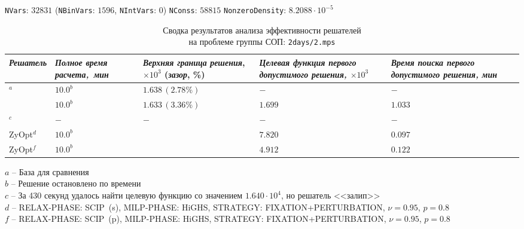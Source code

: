 \documentclass[%
	11pt,
	a4paper,
	utf8,
		]{article}
\begin{document}
\vspace*{5mm}

{
	\begin{table}[!h]
		\centering
		\caption{Сводка результатов анализа эффективности решателей\\ на проблеме группы СОП: \texttt{2days/2.mps}} 
		
		{\footnotesize \texttt{NVars}: $ 32 831 $ (\texttt{NBinVars}: $ 1596 $,  \texttt{NIntVars}: $ 0 $) \texttt{NConss}: $ 58815 $ \texttt{NonzeroDensity}: $ 8.2088 \cdot 10^{-5} $}\\[2mm]
		
		\begin{tabular}{ p{2.9cm} | p{2.5cm} p{3.4cm} p{3.75cm} p{3.6cm} p{3.2cm} }
			\rowcolor{black!5}\emph{Решатель} & \emph{Полное время \mbox{расчета, мин}} & \emph{Верхняя граница} \mbox{\itshape решения}, $ \times 10^{3} $ (\emph{зазор}, \%) & \emph{Целевая функция первого допустимого решения, $ \times 10^3 $} & \emph{Время поиска первого допустимого решения, мин} \\
			\hline
			\rowcolor{blue!3}{CPLEX 12.8.0.0}$ ^a $ & $ 10.0^b $ & $ 1.638 \, (2.78\%) $ & $ - $ & $ - $ \\
			\rowcolor{black!5}{SCIP 8.0.3} & $ 10.0^b $ & $ 1.633 \, (3.36\%) $ & $ 1.699 $ & $ 1.033 $ \\
			\rowcolor{blue!3}{HiGHS 1.5.3}$ ^c $ & $ - $ & $ - $ & $ - $ & $ - $ \\
			\rowcolor{black!5}ZyOpt$^d$ & {$ 10.0^b $}  & \ccb{$ 1.647 \, (4.33\%) (-0.5\%) $} & $ 7.820$ & $ 0.097 $ \\
			\rowcolor{blue!3}ZyOpt$^f$ & {$ 10.0^b $}  & \ccb{$ 1.668 \, (5.54\%) (-1.8\%) $} & $ 4.912 $ & $ 0.122 $ \\
		\end{tabular}
	\end{table}
	\vspace*{-3mm}
	\hspace*{3mm}$ a $ -- {\footnotesize База для сравнения}\\[-7mm]
	
	\hspace*{3mm}$ b $ -- {\footnotesize Решение остановлено по времени}\\[-7mm]
	
	\hspace*{3mm}$ c $ -- {\footnotesize За 430 секунд удалось найти целевую функцию со значением $ 1.640 \cdot 10^{4} $, но решатель <<залип>>}\\[-7mm]
	
	\hspace*{3mm}$ d $ -- {\footnotesize RELAX-PHASE: SCIP~(s), MILP-PHASE: HiGHS, STRATEGY: FIXATION+PERTURBATION, $ \nu = 0.95 $, $ p = 0.8 $}\\[-7mm]
	
	\hspace*{3mm}$ f $ -- {\footnotesize RELAX-PHASE: SCIP~(p), MILP-PHASE: HiGHS, STRATEGY: FIXATION+PERTURBATION, $ \nu = 0.95 $, $ p = 0.8 $}\\[-7mm]
}
\end{document}
